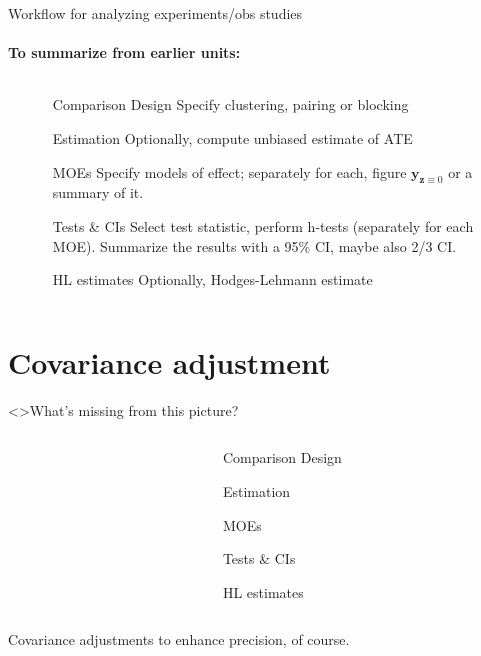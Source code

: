 \begin{frame}{Workflow for analyzing experiments/obs studies}
  \framesubtitle{To summarize from earlier units:}

  \begin{columns}
    \begin{column}{.25\linewidth}
      
    \end{column}
    \begin{column}{.75\linewidth}
        \begin{itemize}
  \item[Comparison Design] Specify clustering, pairing or blocking
  \item[Estimation] Optionally, compute unbiased estimate of ATE
  \item[MOEs] Specify models of effect; separately for each, figure $\mathbf{y}_{\mathbf{z}\equiv 0} $ or a summary of it.
  \item[Tests \& CIs] Select test statistic, perform h-tests (separately for each MOE). Summarize the results with a 95\% CI, maybe also 2/3 CI. 
  \item[HL estimates] Optionally, Hodges-Lehmann estimate
  \end{itemize}

    \end{column}
  \end{columns}
\end{frame}

\section{Covariance adjustment}
\begin{frame}<\nottheirhandout>{What's missing from this picture?}


  \begin{columns}
    \begin{column}{.25\linewidth}
      
    \end{column}
    \begin{column}{.75\linewidth}
        \begin{itemize}
  \item[Comparison Design] 
  \item[Estimation] 
  \item[MOEs] 
  \item[Tests \& CIs] 
  \item[HL estimates] 
  \end{itemize}

    \end{column}
  \end{columns}
\pause

\vfill
Covariance adjustments to enhance precision, of course.
  
\end{frame}

